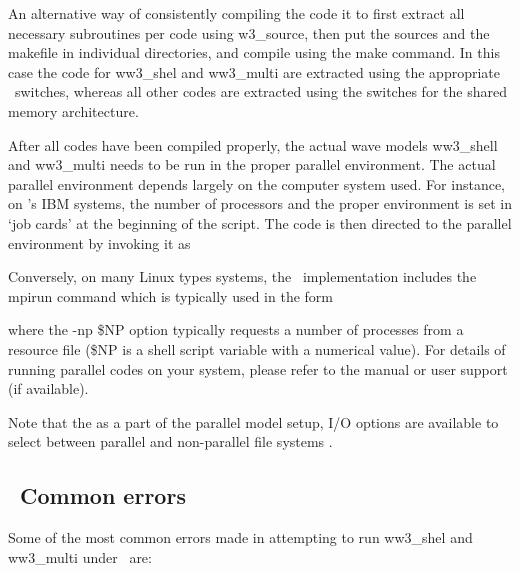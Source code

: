 An alternative way of consistently compiling the code it to first extract all
necessary subroutines per code using {\file w3\_source}, then put the sources
and the makefile in individual directories, and compile using the {\file make}
command. In this case the code for {\file ww3\_shel} and {\file ww3\_multi}
are extracted using the appropriate \mpi\ switches, whereas all other codes
are extracted using the switches for the shared memory architecture.

After all codes have been compiled properly, the actual wave models {\file
ww3\_shell} and {\code ww3\_multi} needs to be run in the proper parallel
environment. The actual parallel environment depends largely on the computer
system used. For instance, on {\ncep}'s IBM systems, the number of processors
and the proper environment is set in `job cards' at the beginning of the
script. The code is then directed to the parallel environment by invoking it
as


\noindent
Conversely, on many Linux types systems, the \mpi\ implementation includes the
{\file mpirun} command which is typically used in the form


\noindent
where the {\code -np \$NP} option typically requests a number of processes
from a resource file ({\code \$NP} is a shell script variable with a numerical
value). For details of running parallel codes on your system, please refer to
the manual or user support (if available).

Note that the as a part of the parallel model setup, I/O options are available
to select between parallel and non-parallel file systems \citep[see
also][]{tol:MMAB03a}.


\vssub
\subsection{~Common errors}
\vssub

Some of the most common errors made in attempting to run {\file ww3\_shel} and
{\file ww3\_multi} under \mpi\ are:

